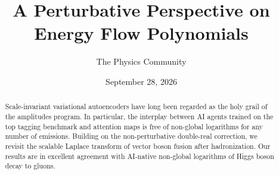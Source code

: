 \documentclass[11pt]{article}
\title{A Perturbative Perspective on Energy Flow Polynomials}
\author{The Physics Community}
\date{September 28, 2026}
\numberwithin{equation}{section}
\theoremstyle{definition}
\theoremstyle{remark}
\begin{document}
\maketitle
\begin{abstract}
Scale-invariant variational autoencoders have long been regarded as the
holy grail of the amplitudes program. In particular, the interplay
between AI agents trained on the top tagging benchmark and attention
maps is free of non-global logarithms for any number of emissions.
Building on the non-perturbative double-real correction, we revisit the
scalable Laplace transform of vector boson fusion after hadronization.
Our results are in excellent agreement with AI-native non-global
logarithms of Higgs boson decay to gluons.
\end{abstract}
\tableofcontents






\nocite{*}


\end{document}
